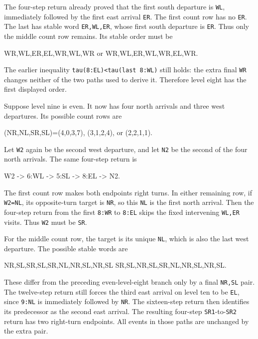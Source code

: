 \documentclass[11pt,letterpaper]{article}
\theoremstyle{plain}
\theoremstyle{definition}
\begin{document}
\begin{NoHyper}
The four-step return already proved that the first south departure is \texttt{WL}, immediately followed by the first east arrival \texttt{ER}. The first count row has no \texttt{ER}. The last has stable word \texttt{ER,WL,ER}, whose first south departure is \texttt{ER}. Thus only the middle count row remains. Its stable order must be

\begin{codeblock}
WR,WL,ER,EL,WR,WL,WR
or WR,WL,ER,WL,WR,EL,WR.
\end{codeblock}

The earlier inequality \texttt{tau(8:EL)\textless{}tau(last\ 8:WL)} still holds: the extra final \texttt{WR} changes neither of the two paths used to derive it. Therefore level eight has the first displayed order.

Suppose level nine is even. It now has four north arrivals and three west departures. Its possible count rows are

\begin{codeblock}
(NR,NL,SR,SL)=(4,0,3,7), (3,1,2,4), or (2,2,1,1).
\end{codeblock}

Let \texttt{W2} again be the second west departure, and let \texttt{N2} be the second of the four north arrivals. The same four-step return is

\begin{codeblock}
W2 -> 6:WL -> 5:SL -> 8:EL -> N2.
\end{codeblock}

The first count row makes both endpoints right turns. In either remaining row, if \texttt{W2=NL}, its opposite-turn target is \texttt{NR}, so this \texttt{NL} is the first north arrival. Then the four-step return from the first \texttt{8:WR} to \texttt{8:EL} skips the fixed intervening \texttt{WL,ER} visits. Thus \texttt{W2} must be \texttt{SR}.

For the middle count row, the target is its unique \texttt{NL}, which is also the last west departure. The possible stable words are

\begin{codeblock}
NR,SL,SR,SL,SR,NL,NR,SL,NR,SL
SR,SL,NR,SL,SR,NL,NR,SL,NR,SL.
\end{codeblock}

These differ from the preceding even-level-eight branch only by a final \texttt{NR,SL} pair. The twelve-step return still forces the third east arrival on level ten to be \texttt{EL}, since \texttt{9:NL} is immediately followed by \texttt{NR}. The sixteen-step return then identifies its predecessor as the second east arrival. The resulting four-step \texttt{SR1}-to-\texttt{SR2} return has two right-turn endpoints. All events in those paths are unchanged by the extra pair.


\end{NoHyper}
\end{document}
